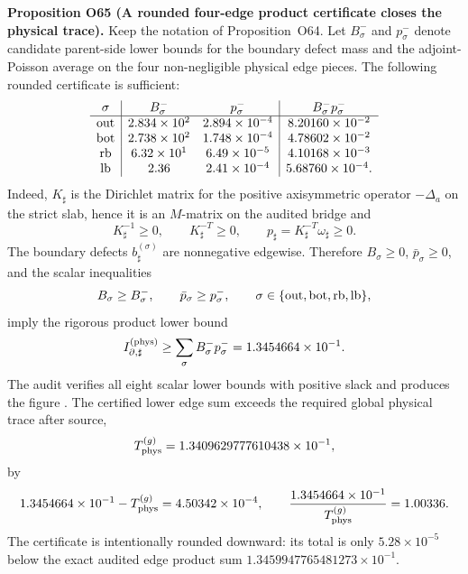 \documentclass[aps,prd,onecolumn,notitlepage,nofootinbib,superscriptaddress,11pt,floatfix]{revtex4-2}
\begin{document}
\medskip\noindent\textbf{Proposition O65 (A rounded four-edge product certificate closes the physical trace).}
Keep the notation of Proposition~O64.  Let \(B_\sigma^-\) and \(p_\sigma^-\) denote candidate parent-side lower bounds for the boundary defect mass and the adjoint-Poisson average on the four non-negligible physical edge pieces.  The following rounded certificate is sufficient:
\[
\begin{array}{c|cc|c}
\sigma & B_\sigma^- & p_\sigma^- & B_\sigma^-p_\sigma^-\\
\hline
{\rm out} & 2.834\times10^2 & 2.894\times10^{-4} & 8.20160\times10^{-2}\\
{\rm bot} & 2.738\times10^2 & 1.748\times10^{-4} & 4.78602\times10^{-2}\\
{\rm rb} & 6.32\times10^1 & 6.49\times10^{-5} & 4.10168\times10^{-3}\\
{\rm lb} & 2.36 & 2.41\times10^{-4} & 5.68760\times10^{-4}.
\end{array}
\]
Indeed, \(K_\sharp\) is the Dirichlet matrix for the positive axisymmetric operator \(-\Delta_a\) on the strict slab, hence it is an \(M\)-matrix on the audited bridge and
\[
K_\sharp^{-1}\ge0,\qquad K_\sharp^{-T}\ge0,\qquad p_\sharp=K_\sharp^{-T}\omega_\sharp\ge0.
\]
The boundary defects \(b_\sharp^{(\sigma)}\) are nonnegative edgewise.  Therefore \(B_\sigma\ge0\), \(\bar p_\sigma\ge0\), and the scalar inequalities
\[
B_\sigma\ge B_\sigma^-,
\qquad
\bar p_\sigma\ge p_\sigma^-,
\qquad
\sigma\in\{{\rm out},{\rm bot},{\rm rb},{\rm lb}\},
\]
imply the rigorous product lower bound
\[
I_{\partial,\sharp}^{(\rm phys)}
\ge
\sum_{\sigma}B_\sigma^-p_\sigma^-
=
1.3454664\times10^{-1}.
\]
The audit
verifies all eight scalar lower bounds with positive slack and produces the figure
.
The certified lower edge sum exceeds the required global physical trace after source,
\[
T_{\rm phys}^{(g)}=1.3409629777610438\times10^{-1},
\]
by
\[
1.3454664\times10^{-1}-T_{\rm phys}^{(g)}
=4.50342\times10^{-4},
\qquad
\frac{1.3454664\times10^{-1}}{T_{\rm phys}^{(g)}}=1.00336.
\]
The certificate is intentionally rounded downward: its total is only \(5.28\times10^{-5}\) below the exact audited edge product sum \(1.3459947765481273\times10^{-1}\).
\end{document}
